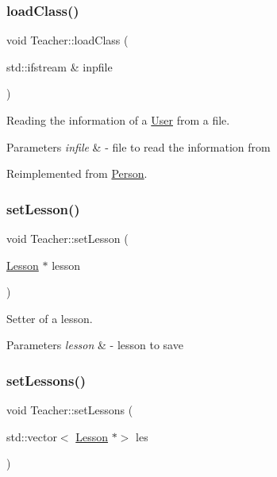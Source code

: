 \subsubsection{\texorpdfstring{load\+Class()}{loadClass()}}
{\footnotesize\ttfamily void Teacher\+::load\+Class (\begin{DoxyParamCaption}\item[{std\+::ifstream \&}]{inpfile }\end{DoxyParamCaption})\hspace{0.3cm}{\ttfamily [virtual]}}



Reading the information of a \mbox{\hyperlink{class_user}{User}} from a file. 


\begin{DoxyParams}{Parameters}
{\em infile} & -\/ file to read the information from \\
\hline
\end{DoxyParams}


Reimplemented from \mbox{\hyperlink{class_person_af07a032df8d56dddade4dc43960b536b}{Person}}.

\mbox{\label{class_teacher_aec95be6f77dc2b692627a6f4a5385971}} 
\subsubsection{\texorpdfstring{set\+Lesson()}{setLesson()}}
{\footnotesize\ttfamily void Teacher\+::set\+Lesson (\begin{DoxyParamCaption}\item[{\mbox{\hyperlink{class_lesson}{Lesson}} $\ast$}]{lesson }\end{DoxyParamCaption})}



Setter of a lesson. 


\begin{DoxyParams}{Parameters}
{\em lesson} & -\/ lesson to save \\
\hline
\end{DoxyParams}
\mbox{\label{class_teacher_a6c234671dbd738bee06f9a34bf11aca4}} 
\subsubsection{\texorpdfstring{set\+Lessons()}{setLessons()}}
{\footnotesize\ttfamily void Teacher\+::set\+Lessons (\begin{DoxyParamCaption}\item[{std\+::vector$<$ \mbox{\hyperlink{class_lesson}{Lesson}} $\ast$$>$}]{les }\end{DoxyParamCaption})}



